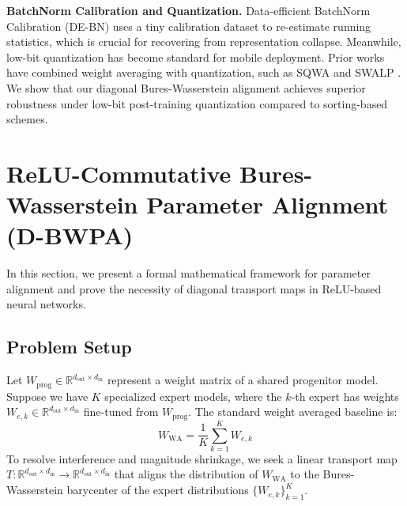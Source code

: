 \documentclass{article}
\theoremstyle{plain}
\theoremstyle{definition}
\theoremstyle{remark}
\begin{document}
\textbf{BatchNorm Calibration and Quantization.}
Data-efficient BatchNorm Calibration (DE-BN) \cite{de_bn} uses a tiny calibration dataset to re-estimate running statistics, which is crucial for recovering from representation collapse. Meanwhile, low-bit quantization \cite{post_training_quant, robustness_quantization} has become standard for mobile deployment. Prior works have combined weight averaging with quantization, such as SQWA \cite{shin2020_sqwa_stochastic} and SWALP \cite{yang2019_swalp_stochastic}. We show that our diagonal Bures-Wasserstein alignment achieves superior robustness under low-bit post-training quantization compared to sorting-based schemes.

\section{ReLU-Commutative Bures-Wasserstein Parameter Alignment (D-BWPA)}
\label{sec:theory}

In this section, we present a formal mathematical framework for parameter alignment and prove the necessity of diagonal transport maps in ReLU-based neural networks.

\subsection{Problem Setup}
Let $W_{\text{prog}} \in \mathbb{R}^{d_{\text{out}} \times d_{\text{in}}}$ represent a weight matrix of a shared progenitor model. Suppose we have $K$ specialized expert models, where the $k$-th expert has weights $W_{e, k} \in \mathbb{R}^{d_{\text{out}} \times d_{\text{in}}}$ fine-tuned from $W_{\text{prog}}$. The standard weight averaged baseline is:
\begin{equation}
  W_{\text{WA}} = \frac{1}{K} \sum_{k=1}^K W_{e, k}
\end{equation}
To resolve interference and magnitude shrinkage, we seek a linear transport map $T: \mathbb{R}^{d_{\text{out}} \times d_{\text{in}}} \to \mathbb{R}^{d_{\text{out}} \times d_{\text{in}}}$ that aligns the distribution of $W_{\text{WA}}$ to the Bures-Wasserstein barycenter of the expert distributions $\{W_{e, k}\}_{k=1}^K$.
\end{document}
